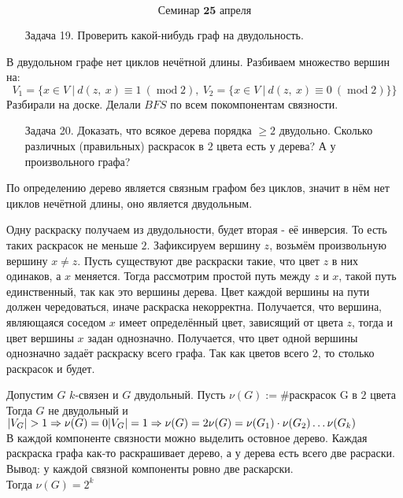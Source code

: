 \documentclass[12pt, letterpaper, twoside]{article}
\begin{document}
    \[\textbf{Семинар 25 апреля}\]
    \begin{enumerate}
        \item[Задача 19.] Проверить какой-нибудь граф на двудольность.
    \end{enumerate}
    В двудольном графе нет циклов нечётной длины. Разбиваем множество вершин на:
    \[V_1 = \{x\in V\ |\ d(z,\ x)\equiv 1\ (\operatorname{mod} 2),\ V_2 = \{x\in V\ |\ d(z,\ x)\equiv 0\ (\operatorname{mod} 2)\}\}\]
    Разбирали на доске. Делали $BFS$ по всем покомпонентам связности.
    \begin{enumerate}
        \item[Задача 20.] Доказать, что всякое дерева порядка $\geq 2$ двудольно. Сколько различных (правильных) раскрасок в $2$ цвета есть у дерева? А у произвольного графа? 
    \end{enumerate}
    По определению дерево является связным графом без циклов, значит в нём нет циклов нечётной длины, оно является двудольным.\par
    Одну раскраску получаем из двудольности, будет вторая - её инверсия. То есть таких раскрасок не меньше $2$. Зафиксируем вершину $z$, возьмём произвольную вершину $x\neq z$. Пусть существуют две раскраски такие, что цвет $z$ в них одинаков, а $x$ меняется. Тогда рассмотрим простой путь между $z$ и $x$, такой путь единственный, так как это вершины дерева. Цвет каждой вершины на пути должен чередоваться, иначе раскраска некорректна. Получается, что вершина, являющаяся соседом $x$ имеет определённый цвет, зависящий от цвета $z$, тогда и цвет вершины $x$ задан однозначно. Получается, что цвет одной вершины однозначно задаёт раскраску всего графа. Так как цветов всего $2$, то столько раскрасок и будет.\par
    Допустим $G$ $k$-связен и $G$ двудольный. Пусть $\nu(G) := \#\text{раскрасок G в 2 цвета}$\\
    Тогда $G$ не двудольный и\\
    $|V_G| > 1\Rightarrow \nu(G)= 0\\
    |V_G| = 1\Rightarrow \nu(G) = 2\\
    \nu(G) = \nu(G_1)\cdot \nu(G_2)\dots\nu(G_k)$\\
    В каждой компоненте связности можно выделить остовное дерево. Каждая раскраска графа как-то раскрашивает дерево, а у дерева есть всего две расраски.\\
    Вывод: у каждой связной компоненты ровно две раскарски.\\
    Тогда $\nu(G) = 2^k$\\
\end{document}
